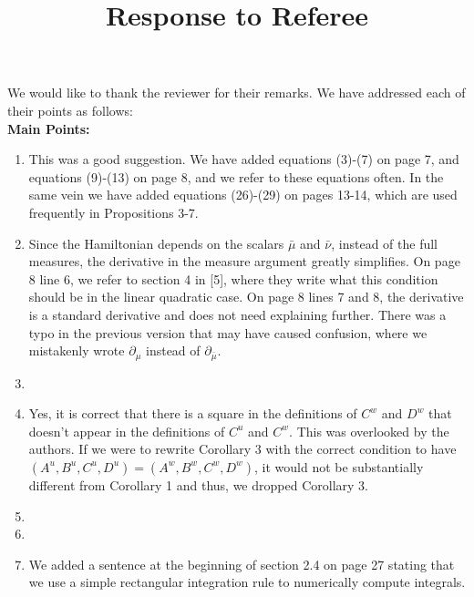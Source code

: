 \documentclass[]{article}
\title{Response to Referee}
\author{}
\begin{document}
\maketitle

We would like to thank the reviewer for their remarks. We have addressed each of their points as follows:\\

\hspace{-7mm} \textbf{Main Points:}
\begin{enumerate}
	\item This was a good suggestion. We have added equations (3)-(7) on page 7, and equations (9)-(13) on page 8, and we refer to these equations often. In the same vein we have added equations (26)-(29) on pages 13-14, which are used frequently in Propositions 3-7.
	\item Since the Hamiltonian depends on the scalars $\bar{\mu}$ and $\bar{\nu}$, instead of the full measures, the derivative in the measure argument greatly simplifies. On page 8 line 6, we refer to section 4 in [5], where they write what this condition should be in the linear quadratic case. On page 8 lines 7 and 8, the derivative is a standard derivative and does not need explaining further. There was a typo in the previous version that may have caused confusion, where we mistakenly wrote $\partial_{\mu}$ instead of $\partial_{\bar{\mu}}$.
	\item 
	\item Yes, it is correct that there is a square in the definitions of $C^w$ and $D^w$ that doesn't appear in the definitions of $C^u$ and $C^w$. This was overlooked by the authors. If we were to rewrite Corollary 3 with the correct condition to have $(A^u,B^u,C^u,D^u)=(A^w,B^w,C^w,D^w)$, it would not be substantially different from Corollary 1 and thus, we dropped Corollary 3.
	\item
	\item
	\item We added a sentence at the beginning of section 2.4 on page 27 stating that we use a simple rectangular integration rule to numerically compute integrals.
\end{enumerate}
\end{document}
